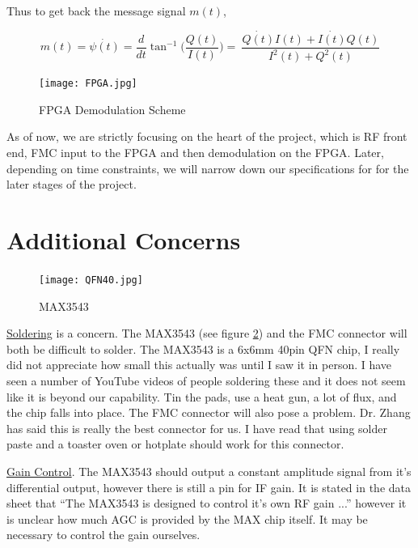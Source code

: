 \documentclass[a4paper, 12pt]{article}
\begin{document}
Thus to get back the message signal $m(t)$,

\begin{equation}
m(t) = \dot{\psi(t)} = \frac{d}{dt}\tan^{-1}{\Big(\frac{Q(t)}{I(t)}\Big)} =\
\frac{\dot{Q(t)}I(t) + \dot{I(t)}Q(t)}{I^2(t) + Q^2(t)}
\end{equation}

\begin{figure}
\centering
\texttt{[image: FPGA.jpg]}
\caption{FPGA Demodulation Scheme}
\label{fig:fpga}
\end{figure}

As of now, we are strictly focusing on the heart of the project, which is RF front end, FMC input to the FPGA and then demodulation on the FPGA. Later, depending on time constraints, we will narrow down our specifications for for the later stages of the project. 
\section{Additional Concerns}

\begin{figure}
\texttt{[image: QFN40.jpg]}
\caption{MAX3543}
\label{fig:qfn40}
\end{figure}

\underline{Soldering} is a concern.  The MAX3543 (see figure \ref{fig:qfn40}) and the FMC connector will both be difficult to solder.  The MAX3543 is a 6x6mm 40pin QFN chip, I really did not appreciate how small this actually was until I saw it in person.  I have seen a number of YouTube videos of people soldering these and it does not seem like it is beyond our capability.  Tin the pads, use a heat gun, a lot of flux, and the chip falls into place.  The FMC connector will also pose a problem.  Dr. Zhang has said this is really the best connector for us.  I have read that using solder paste and a toaster oven or hotplate should work for this connector.

\underline{Gain Control}.  The MAX3543 should output a constant amplitude signal from it's differential output, however there is still a pin for IF gain.  It is stated in the data sheet that ``The MAX3543 is designed to control it's own RF gain ...'' however it is unclear how much AGC is provided by the MAX chip itself.  It may be necessary to control the gain ourselves.

\clearpage


\end{document}
